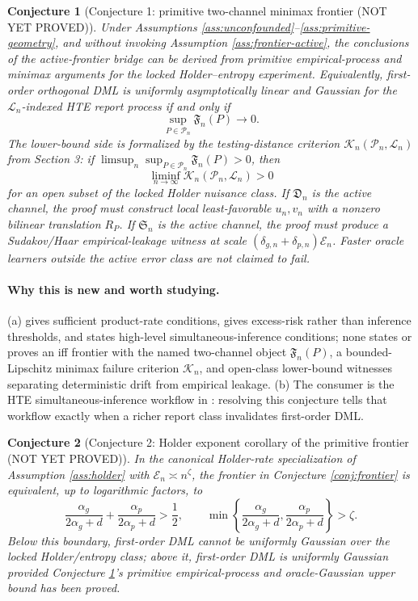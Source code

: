\documentclass[11pt]{article}
\theoremstyle{definition}
\theoremstyle{plain}
\newtheorem{conjecture}{Conjecture}
\theoremstyle{remark}
\begin{document}
\begin{conjecture}[Conjecture 1: primitive two-channel minimax frontier (NOT YET PROVED)]\label{conj:primitive-frontier}\label{conj:frontier}
Under Assumptions \ref{ass:unconfounded}--\ref{ass:primitive-geometry}, and
without invoking Assumption \ref{ass:frontier-active}, the conclusions of the
active-frontier bridge can be derived from primitive empirical-process and
minimax arguments for the locked Holder--entropy experiment.  Equivalently,
first-order orthogonal DML is uniformly asymptotically linear and Gaussian for
the \(\mathcal{L}_n\)-indexed HTE report process if and only if
\[
\sup_{P\in\mathcal{P}_n}\mathfrak{F}_n(P)\to0.
\]
The lower-bound side is formalized by the testing-distance criterion
\(\mathcal{K}_n(\mathcal{P}_n,\mathcal{L}_n)\) from Section 3: if
\(\limsup_n\sup_{P\in\mathcal{P}_n}\mathfrak{F}_n(P)>0\), then
\[
\liminf_{n\to\infty}\mathcal{K}_n(\mathcal{P}_n,\mathcal{L}_n)>0
\]
for an open subset of the locked Holder nuisance class.  If
\(\mathfrak{D}_n\) is the active channel, the proof must construct local
least-favorable \(u_n,v_n\) with a nonzero bilinear translation \(R_P\).  If
\(\mathfrak{S}_n\) is the active channel, the proof must produce a
Sudakov/Haar empirical-leakage witness at scale
\((\delta_{g,n}+\delta_{p,n})\mathcal{E}_n\).  Faster oracle learners outside
the active error class are not claimed to fail.
\end{conjecture}
\paragraph{Why this is new and worth studying.}
(a) \citet[\S3]{ChernozhukovEtAl2018DML} gives sufficient product-rate
conditions, \citet[\S2--\S3]{FosterSyrgkanis2023OSL} gives excess-risk rather
than inference thresholds, and \citet[\S3]{SemenovaChernozhukov2021DMLCATE}
states high-level simultaneous-inference conditions; none states or proves an
iff frontier with the named two-channel object \(\mathfrak{F}_n(P)\), a
bounded-Lipschitz minimax failure criterion \(\mathcal{K}_n\), and open-class
lower-bound witnesses separating deterministic drift from empirical leakage.
(b) The consumer is the HTE simultaneous-inference workflow in
\citet{SemenovaChernozhukov2021DMLCATE}: resolving this conjecture tells that
workflow exactly when a richer report class invalidates first-order DML.

\begin{conjecture}[Conjecture 2: Holder exponent corollary of the primitive frontier (NOT YET PROVED)]\label{conj:holder}
In the canonical Holder-rate specialization of Assumption \ref{ass:holder} with
\(\mathcal{E}_n\asymp n^\zeta\), the frontier in Conjecture
\ref{conj:frontier} is equivalent, up to logarithmic factors, to
\[
\frac{\alpha_g}{2\alpha_g+d}+\frac{\alpha_p}{2\alpha_p+d}
>\frac12,\qquad
\min\left\{\frac{\alpha_g}{2\alpha_g+d},\frac{\alpha_p}{2\alpha_p+d}\right\}
>\zeta.
\]
Below this boundary, first-order DML cannot be uniformly Gaussian over the
locked Holder/entropy class; above it, first-order DML is uniformly Gaussian
provided Conjecture \ref{conj:primitive-frontier}'s primitive empirical-process
and oracle-Gaussian upper bound has been proved.
\end{conjecture}
\end{document}
